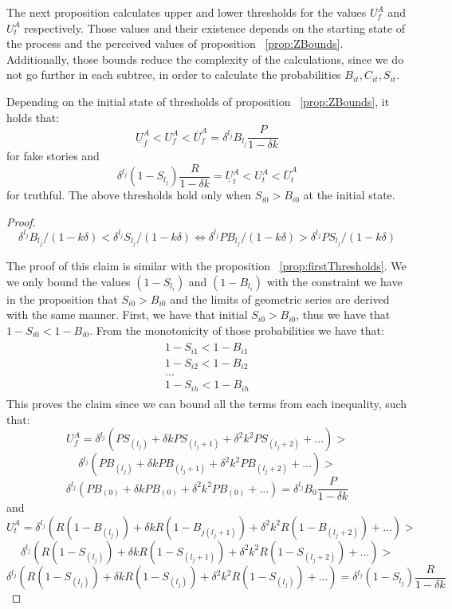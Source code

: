 \iffalse
The next proposition calculates upper and lower thresholds for the values $U_f^A$ and $U_t^A$ respectively. Those values and their existence depends on the starting state of the process and the perceived values of proposition ~\ref{prop:ZBounds}. Additionally, those bounds reduce the complexity of the calculations, since we do not go further in each subtree, in order to calculate the probabilities $B_{it},C_{it},S_{it}$.

\begin{prop}
	Depending on the initial state of thresholds of proposition ~\ref{prop:ZBounds}, it holds that:
	$$\underline{U}_f^A < U_f^A  < \overline{U}_f^A =  \delta^{l_j}B_{l_j} \frac{P}{1-\delta k}$$for fake stories and
	$$ \delta^{l_j}(1-S_{l_j}) \frac{R}{1-\delta k} =\underline{U}_t^A < U_t^A <  \overline{U}_t^A$$for truthful.
The above thresholds hold only when $S_{i0} > B_{i0}$ at the initial state.
	
\end{prop}


\begin{proof}
	\[
\delta^{l_j} B_{l_j} / (1 - k\delta) 
< \delta^{l_j} S_{l_j} / (1 - k\delta)
\Leftrightarrow
\delta^{l_j} P B_{l_j} / (1 - k\delta) 
> \delta^{l_j} P S_{l_j} / (1 - k\delta)
\]
	
The proof of this claim is similar with the proposition ~\ref{prop:firstThresholds}. We we only bound the values $(1-S_{l_i})$ and $(1-B_{l_i})$ with the constraint we have in the proposition that $S_{i0} > B_{i0}$ and the limits of geometric series are derived with the same manner. First, we have that initial $S_{i0} > B_{i0}$, thus we have that $1-S_{i0} < 1-B_{i0}$. From the monotonicity of those probabilities we have that:
\begin{align}
\begin{split}
1-S_{i1} < 1-B_{i1} \\
1-S_{i2} < 1-B_{i2} \\
... \\
1-S_{ih} < 1-B_{ih}
\end{split}
\end{align}
This proves the claim since we can bound all the terms from each inequality, such that:	
$$U_f^A = \delta^{l_j} (P S_{(l_j)} + \delta k PS_{(l_j + 1)} +\delta^2 k^2 P S_{(l_j + 2)}+...) >  $$ $$\delta^{l_j} (P B_{(l_j)} + \delta k PB_{(l_j + 1)} +\delta^2 k^2 P B_{(l_j + 2)}+...) >$$
$$\delta^{l_j} (P B_{(0)} + \delta k PB_{(0)} +\delta^2 k^2 P B_{(0)}+...) = \delta^{l_j}B_{0} \frac{P}{1-\delta k} $$
and
$$U_t^A = \delta^{l_j} (R (1-B_{(l_j)}) + \delta k R (1-B_{j(l_j + 1)}) +\delta^2 k^2 R (1-B_{(l_j + 2)})+...) >  $$ $$\delta^{l_j} (R (1-S_{(l_j)}) + \delta k R (1-S_{(l_j + 1)}) +\delta^2 k^2 R (1-S_{(l_j + 2)})+...)	>$$
$$\delta^{l_j} (R (1-S_{(l_j)}) + \delta k R (1-S_{(l_j)}) +\delta^2 k^2 R (1-S_{(l_j)})+...) = \delta^{l_j}(1-S_{l_j}) \frac{R}{1-\delta k}	$$
\end{proof}



